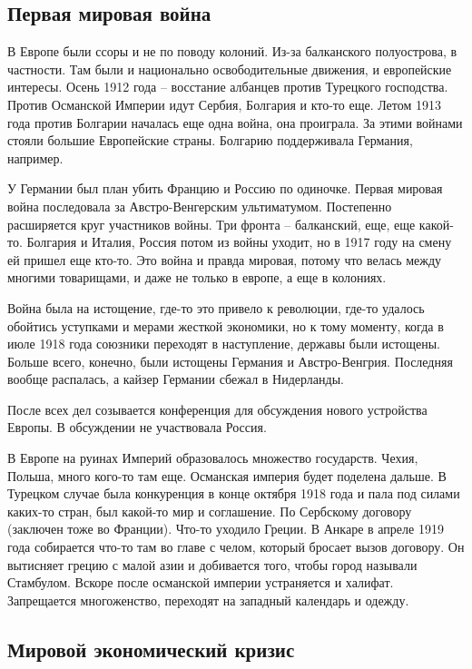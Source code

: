 \documentclass[a4paper, 12pt]{article}
\begin{document}
\begin{multicols}{2}
\subsection{Первая мировая война}
В Европе были ссоры и не по поводу колоний. Из-за балканского полуострова, в частности. Там были и национально освободительные движения, и европейские интересы. 
Осень 1912 года -- восстание албанцев против Турецкого господства. Против Османской Империи идут Сербия, Болгария и кто-то еще. Летом 1913 года против Болгарии началась еще одна война, она проиграла. За этими войнами стояли большие Европейские страны. Болгарию поддерживала Германия, например. 

У Германии был план убить Францию и Россию по одиночке. Первая мировая война последовала за Австро-Венгерским ультиматумом. Постепенно расширяется круг участников войны. Три фронта -- балканский, еще, еще какой-то. Болгария и Италия, Россия потом из войны уходит, но в 1917 году на смену ей пришел еще кто-то. Это война и правда мировая, потому что велась между многими товарищами, и даже не только в европе, а еще в колониях. 

Война была на истощение, где-то это привело к революции, где-то удалось обойтись уступками и мерами жесткой экономики, но к тому моменту, когда в июле 1918 года союзники переходят в наступление, державы были истощены. Больше всего, конечно, были истощены Германия и Австро-Венгрия. Последняя вообще распалась, а кайзер Германии сбежал в Нидерланды. 

После всех дел созывается конференция для обсуждения нового устройства Европы. В обсуждении не участвовала Россия. 

В Европе на руинах Империй образовалось множество государств. Чехия, Польша, много кого-то там еще. Османская империя будет поделена дальше. В Турецком случае была конкуренция в конце октября 1918 года и пала под силами каких-то стран, был какой-то мир и соглашение. По Сербскому договору (заключен тоже во Франции). Что-то уходило Греции. В Анкаре в апреле 1919 года собирается что-то там во главе с челом, который бросает вызов договору. Он вытисняет грецию с малой азии и добивается того, чтобы город называли Стамбулом. Вскоре после османской империи устраняется и халифат. Запрещается многоженство, переходят на западный календарь и одежду. 

\subsection{Мировой экономический кризис}


\end{multicols}
\end{document}
